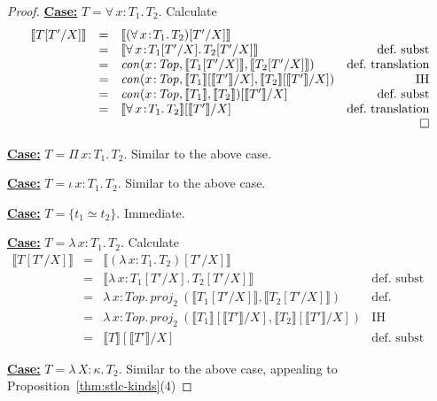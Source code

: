 \documentclass{article}
\newcommand{\abs}[4]{{#1}\, #2\! : \! #3.\, #4}
\newcommand{\interp}[1]{\llbracket #1 \rrbracket}
\newcommand{\startcase}[1]{\vspace{#1} \noindent\textbf{\underline{Case:}}}
\begin{document}
\begin{proof}
  \startcase{.2cm} \(T = \abs{\forall}{x}{T_1}{T_2}\).
  Calculate
  \[
    \begin{array}{lclr}
      \interp{T[T'/X]}
      & =
      & \interp{(\abs{\forall}{x}{T_1}{T_2})[T'/X]}
      &
      \\
      & =
      & \interp{\abs{\forall}{x}{T_1[T'/X]}{T_2[T'/X]}}
      & \text{def.\ subst}
      \\
      & =
      & \mathit{con}(x\!:\!\mathit{Top},\interp{T_1[T'/X]},\interp{T_2[T'/X]})
      & \text{def.\ translation}
      \\
      & =
      & \mathit{con}(x\!:\!\mathit{Top},\interp{T_1}[\interp{T'}/X],\interp{T_2}[\interp{T'}/X])
      & \text{IH}
      \\
      & =
      & \mathit{con}(x\!:\!\mathit{Top},\interp{T_1},\interp{T_2})[\interp{T'}/X]
      & \text{def.\ subst}
      \\
      & =
      & \interp{\abs{\forall}{x}{T_1}{T_2}}[\interp{T'}/X]
      & \text{def.\ translation}
      \\
      &
      &
      & \qed
    \end{array}
  \]

  \startcase{.2cm} \(T = \abs{\Pi}{x}{T_1}{T_2}\). Similar to the above case.

  \startcase{.2cm} \(T = \abs{\iota}{x}{T_1}{T_2}\). Similar to the above case.

  \startcase{.2cm} \(T = \{t_1 \simeq t_2\}\). Immediate.
  
  \startcase{.2cm} \(T = \abs{\lambda}{x}{T_1}{T_2}\).
  Calculate
  \[
    \begin{array}{lclr}
      \interp{T[T'/X]}
      & =
      & \interp{(\abs{\lambda}{x}{T_1}{T_2})[T'/X]}
      &
      \\
      & =
      & \interp{\abs{\lambda}{x}{T_1[T'/X]}{T_2[T'/X]}}
      & \text{def.\ subst}
      \\
      & =
      & \abs{\lambda}{x}{\mathit{Top}}{\mathit{proj}_2\ (\interp{T_1[T'/X]},\interp{T_2[T'/X]})}
      & \text{def.\ translation}
      \\
      & =
      & \abs{\lambda}{x}{\mathit{Top}}{\mathit{proj}_2\ (\interp{T_1}[\interp{T'}/X],\interp{T_2}[\interp{T'}/X])}
      & \text{IH}
      \\
      & =
      & \interp{T}[\interp{T'}/X]
      & \text{def.\ subst}
    \end{array}
  \]

 
  \startcase{.2cm} \(T = \abs{\lambda}{X}{\kappa}{T_2}\).
  Similar to the above case, appealing to Proposition~\ref{thm:stlc-kinds}(4)


\end{proof}
\end{document}
